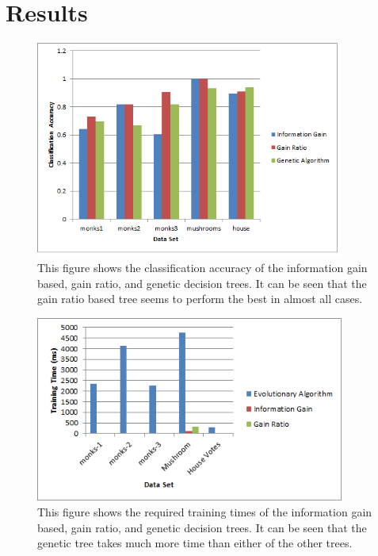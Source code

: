 \documentclass[12pt, letterpaper]{article}
\begin{document}
\section{Results}
\begin{figure}[!htb]
\begin{center}
\includegraphics[width=4in]{images/algorithm_comparison_accuracy.png}
\end{center}
\caption{This figure shows the classification accuracy of the information gain
based, gain ratio, and genetic decision trees.  It can be seen that the gain 
ratio based tree seems to perform the best in almost all cases.}
\label{Classification Accuracies of Multiple Decision Trees}
\end{figure}

\begin{figure}[!htb]
\begin{center}
\includegraphics[width=4in]{images/algorithm_comparison_training_time.png}
\end{center}
\caption{This figure shows the required training times of the information gain
based, gain ratio, and genetic decision trees.  It can be seen that the genetic
tree takes much more time than either of the other trees.}
\label{Training Times of Multiple Decision Trees}
\end{figure}
\end{document}
